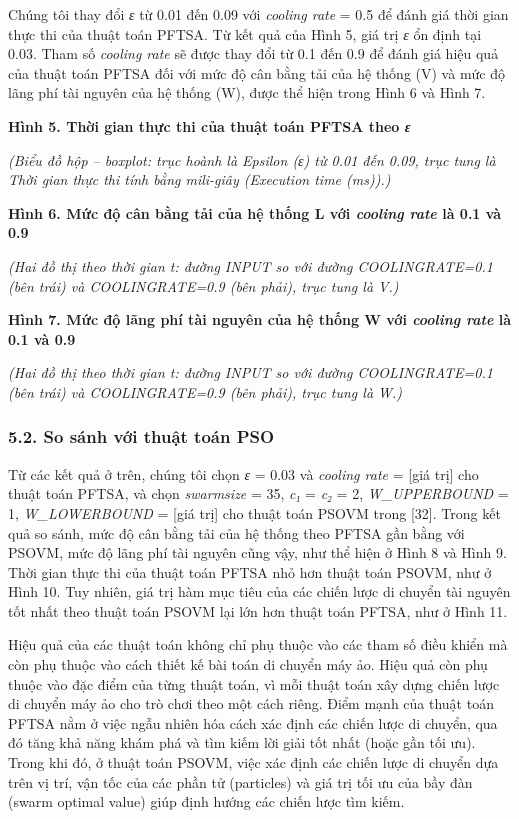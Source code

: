 \documentclass[
  vietnamese,
]{article}
\begin{document}
Chúng tôi thay đổi \emph{ε} từ 0.01 đến 0.09 với \emph{cooling rate} =
0.5 để đánh giá thời gian thực thi của thuật toán PFTSA. Từ kết quả của
Hình 5, giá trị \emph{ε} ổn định tại 0.03. Tham số \emph{cooling rate}
sẽ được thay đổi từ 0.1 đến 0.9 để đánh giá hiệu quả của thuật toán
PFTSA đối với mức độ cân bằng tải của hệ thống (V) và mức độ lãng phí
tài nguyên của hệ thống (W), được thể hiện trong Hình 6 và Hình 7.

\textbf{Hình 5. Thời gian thực thi của thuật toán PFTSA theo \emph{ε}}

\emph{(Biểu đồ hộp -- boxplot: trục hoành là Epsilon (ε) từ 0.01 đến
0.09, trục tung là Thời gian thực thi tính bằng mili-giây (Execution
time (ms)).)}

\textbf{Hình 6. Mức độ cân bằng tải của hệ thống L với \emph{cooling
rate} là 0.1 và 0.9}

\emph{(Hai đồ thị theo thời gian t: đường INPUT so với đường
COOLINGRATE=0.1 (bên trái) và COOLINGRATE=0.9 (bên phải), trục tung là
V.)}

\textbf{Hình 7. Mức độ lãng phí tài nguyên của hệ thống W với
\emph{cooling rate} là 0.1 và 0.9}

\emph{(Hai đồ thị theo thời gian t: đường INPUT so với đường
COOLINGRATE=0.1 (bên trái) và COOLINGRATE=0.9 (bên phải), trục tung là
W.)}

\subsubsection{5.2. So sánh với thuật toán
PSO}\label{so-suxe1nh-vux1edbi-thuux1eadt-touxe1n-pso}

Từ các kết quả ở trên, chúng tôi chọn \emph{ε} = 0.03 và \emph{cooling
rate} = {[}giá trị{]} cho thuật toán PFTSA, và chọn \emph{swarmsize} =
35, \emph{c₁} = \emph{c₂} = 2, \emph{W\_UPPERBOUND} = 1,
\emph{W\_LOWERBOUND} = {[}giá trị{]} cho thuật toán PSOVM trong
{[}32{]}. Trong kết quả so sánh, mức độ cân bằng tải của hệ thống theo
PFTSA gần bằng với PSOVM, mức độ lãng phí tài nguyên cũng vậy, như thể
hiện ở Hình 8 và Hình 9. Thời gian thực thi của thuật toán PFTSA nhỏ hơn
thuật toán PSOVM, như ở Hình 10. Tuy nhiên, giá trị hàm mục tiêu của các
chiến lược di chuyển tài nguyên tốt nhất theo thuật toán PSOVM lại lớn
hơn thuật toán PFTSA, như ở Hình 11.

Hiệu quả của các thuật toán không chỉ phụ thuộc vào các tham số điều
khiển mà còn phụ thuộc vào cách thiết kế bài toán di chuyển máy ảo. Hiệu quả còn phụ thuộc vào đặc điểm của từng thuật toán, vì mỗi thuật toán xây dựng chiến lược di chuyển máy ảo cho trò chơi theo một cách riêng. Điểm mạnh của thuật toán PFTSA nằm ở việc ngẫu
nhiên hóa cách xác định các chiến lược di chuyển, qua đó tăng khả năng
khám phá và tìm kiếm lời giải tốt nhất (hoặc gần tối ưu). Trong khi đó,
ở thuật toán PSOVM, việc xác định các chiến lược di chuyển dựa trên vị
trí, vận tốc của các phần tử (particles) và giá trị tối ưu của bầy đàn
(swarm optimal value) giúp định hướng các chiến lược tìm kiếm.
\end{document}
